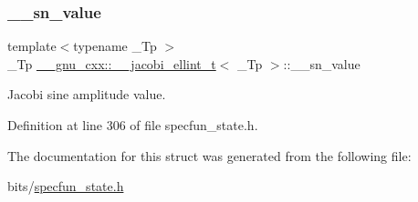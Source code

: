 \subsubsection{\texorpdfstring{\+\_\+\+\_\+sn\+\_\+value}{\_\_sn\_value}}
{\footnotesize\ttfamily template$<$typename \+\_\+\+Tp $>$ \\
\+\_\+\+Tp \hyperlink{struct____gnu__cxx_1_1____jacobi__ellint__t}{\+\_\+\+\_\+gnu\+\_\+cxx\+::\+\_\+\+\_\+jacobi\+\_\+ellint\+\_\+t}$<$ \+\_\+\+Tp $>$\+::\+\_\+\+\_\+sn\+\_\+value}



Jacobi sine amplitude value. 



Definition at line 306 of file specfun\+\_\+state.\+h.



The documentation for this struct was generated from the following file\+:\begin{DoxyCompactItemize}
\item 
bits/\hyperlink{specfun__state_8h}{specfun\+\_\+state.\+h}\end{DoxyCompactItemize}
